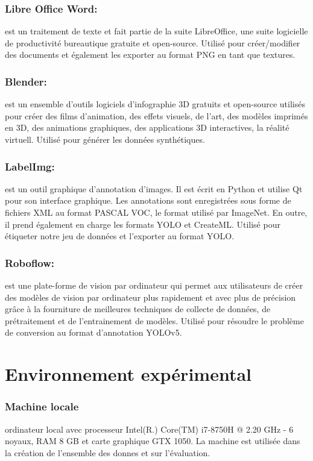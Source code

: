                \subsubsection{Libre Office Word:} est un traitement de texte et fait partie de la suite LibreOffice, une suite logicielle de productivité bureautique gratuite et open-source. Utilisé pour créer/modifier des documents et également les exporter au format PNG en tant que textures.
               \subsubsection{Blender:} est un ensemble d'outils logiciels d'infographie 3D gratuits et open-source utilisés pour créer des films d'animation, des effets visuels, de l'art, des modèles imprimés en 3D, des animations graphiques, des applications 3D interactives, la réalité virtuell. Utilisé pour générer les données synthétiques. 
               \subsubsection{LabelImg:} est un outil graphique d'annotation d'images. Il est écrit en Python et utilise Qt pour son interface graphique. Les annotations sont enregistrées sous forme de fichiers XML au format PASCAL VOC, le format utilisé par ImageNet. En outre, il prend également en charge les formats YOLO et CreateML. Utilisé pour étiqueter notre jeu de données et l'exporter au format YOLO.  
               \subsubsection{Roboflow:} est une plate-forme de vision par ordinateur qui permet aux utilisateurs de créer des modèles de vision par ordinateur plus rapidement et avec plus de précision grâce à la fourniture de meilleures techniques de collecte de données, de prétraitement et de l'entrainement de modèles. Utilisé pour résoudre le problème de conversion au format d'annotation YOLOv5.

\section{Environnement expérimental}
     \subsubsection{Machine locale} ordinateur local avec processeur Intel(R.) Core(TM) i7-8750H @ 2.20 GHz - 6 noyaux, RAM 8 GB et carte graphique GTX 1050. La machine est utilisée dans la création de l'ensemble des donnes et sur l'évaluation.
